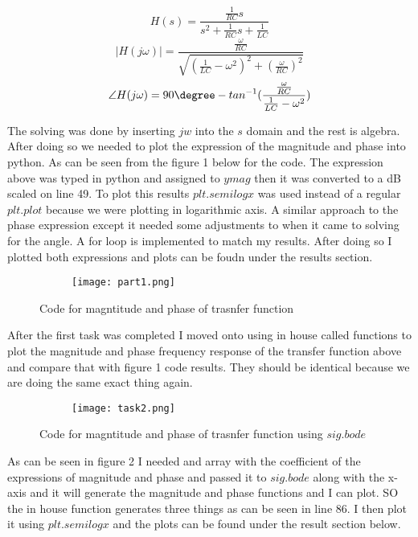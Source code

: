 \documentclass[12pt,a4paper]{article}
\begin{document}
\[H(s) = \frac{\frac{1}{RC}s}{s^{2} + \frac{1}{RC}s + \frac{1}{LC}}\]
\[|H(j\omega)| = \frac{\frac{\omega}{RC}}{\sqrt{(\frac{1}{LC} - \omega^2)^{2} + (\frac{\omega}{RC})^{2}}}\] \[\angle H(j\omega) = 90\degree- tan^{-1}(\frac{\frac{\omega}{RC}}{\frac{1}{LC}-\omega^2})                   \]




The solving was done by inserting $jw $ into the $s$ domain and the rest is algebra. After doing so we needed to plot the expression of the magnitude and phase into python. As can be seen from the figure 1 below for the code. The expression above was typed in python and assigned to $ymag$ then it was converted to a dB scaled on line 49. To plot this results $plt.semilogx$ was used instead of a regular $plt.plot$ because we were plotting in logarithmic axis. A similar approach to the phase expression except it needed some adjustments to when it came to solving for the angle. A for loop is implemented to match my results. After doing so I plotted both expressions and plots can be foudn under the results section.




\begin{figure}[h]
\begin{subfigure}{ 1\textwidth}
\texttt{[image: part1.png]}
\end{subfigure}
\caption{Code for magntitude and phase of trasnfer function}
\label{fig:image2}
\end{figure}




\clearpage

After the first task was completed I moved onto using in house called functions to plot the magnitude and phase frequency response of the transfer function above and compare that with figure 1 code results. They should be identical because we are doing the same exact thing again. 

\begin{figure}[h]
\begin{subfigure}{ 1\textwidth}
\texttt{[image: task2.png]}
\end{subfigure}
\caption{Code for magntitude and phase of trasnfer function using $sig.bode$}
\label{fig:image2}
\end{figure}

As can be seen in figure 2 I needed and array with the coefficient of the expressions of magnitude and phase and passed it to $sig.bode$ along with the x-axis and it will generate the magnitude and phase functions and I can plot. SO the in house function generates three things as can be seen in line 86. I then plot it using $plt.semilogx$ and the plots can be found under the result section below.\newline
\end{document}
